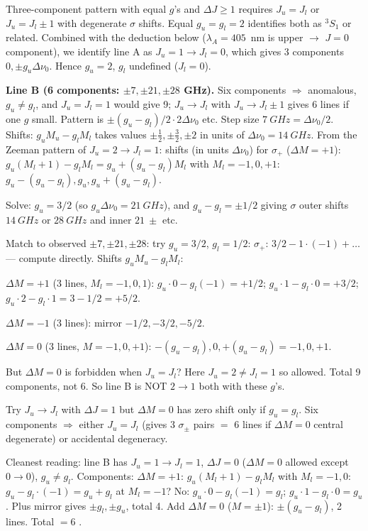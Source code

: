 \documentclass[11pt]{article}
\begin{document}
Three-component pattern with equal $g$'s and $\Delta J\geq 1$ requires $J_u = J_l$
or $J_u = J_l\pm 1$ with degenerate $\sigma$ shifts. Equal $g_u=g_l=2$ identifies
both as $^3S_1$ or related. Combined with the deduction below ($\lambda_A=405$~nm
is upper $\to$ $J=0$ component), we identify line A as $J_u=1\to J_l=0$, which
gives 3 components $0,\pm g_u\Delta\nu_0$. Hence $g_u = 2$, $g_l$ undefined ($J_l=0$).

\textbf{Line B (6 components: $\pm 7,\pm 21,\pm 28$ GHz).} Six components
$\Rightarrow$ anomalous, $g_u\neq g_l$, and $J_u = J_l = 1$ would give 9; $J_u\to J_l$
with $J_u\to J_l\pm 1$ gives 6 lines if one $g$ small. Pattern is
$\pm(g_u-g_l)/2\cdot 2\Delta\nu_0$ etc. Step size $\SI{7}{GHz}=\Delta\nu_0/2$.
Shifts: $g_u M_u - g_l M_l$ takes values $\pm\tfrac12,\pm\tfrac32,\pm 2$ in units
of $\Delta\nu_0 = \SI{14}{GHz}$. From the Zeeman pattern of $J_u=2\to J_l=1$:
shifts (in units $\Delta\nu_0$) for $\sigma_+$ ($\Delta M=+1$):
$g_u(M_l+1)-g_l M_l = g_u + (g_u-g_l)M_l$ with $M_l=-1,0,+1$:
$g_u-(g_u-g_l), g_u, g_u+(g_u-g_l)$.

Solve: $g_u = 3/2$ (so $g_u\Delta\nu_0 = \SI{21}{GHz}$), and $g_u-g_l = \pm 1/2$
giving $\sigma$ outer shifts $\SI{14}{GHz}$ or $\SI{28}{GHz}$ and inner $\SI{21}{}\pm$ etc.

Match to observed $\pm 7,\pm 21,\pm 28$: try $g_u = 3/2$, $g_l = 1/2$:
$\sigma_+$: $3/2-1\cdot(-1)+\dots$ --- compute directly. Shifts
$g_u M_u - g_l M_l$:

$\Delta M=+1$ (3 lines, $M_l=-1,0,1$): $g_u\cdot 0 - g_l(-1)=+1/2$;
$g_u\cdot 1 - g_l\cdot 0 = +3/2$; $g_u\cdot 2 - g_l\cdot 1 = 3-1/2=+5/2$.

$\Delta M=-1$ (3 lines): mirror $-1/2,-3/2,-5/2$.

$\Delta M=0$ (3 lines, $M=-1,0,+1$): $-(g_u-g_l),0,+(g_u-g_l) = -1,0,+1$.

But $\Delta M=0$ is forbidden when $J_u=J_l$? Here $J_u=2\neq J_l=1$ so allowed.
Total 9 components, not 6. So line B is NOT $2\to 1$ both with these $g$'s.

Try $J_u\to J_l$ with $\Delta J=1$ but $\Delta M=0$ has zero shift only if $g_u=g_l$. Six components $\Rightarrow$ either $J_u=J_l$ (gives 3 $\sigma_\pm$ pairs $=$ 6 lines if $\Delta M=0$ central degenerate) or accidental degeneracy.

Cleanest reading: line B has $J_u=1\to J_l=1$, $\Delta J=0$ ($\Delta M=0$ allowed except $0\to 0$), $g_u\neq g_l$. Components: $\Delta M=+1$: $g_u(M_l+1)-g_l M_l$ with $M_l=-1,0$: $g_u-g_l\cdot(-1)=g_u+g_l$ at $M_l=-1$? No: $g_u\cdot 0 - g_l(-1)=g_l$; $g_u\cdot 1 - g_l\cdot 0=g_u$. Plus mirror gives $\pm g_l,\pm g_u$, total 4. Add $\Delta M=0$ ($M=\pm 1$): $\pm(g_u-g_l)$, 2 lines. Total $= 6$ \checkmark.
\end{document}
